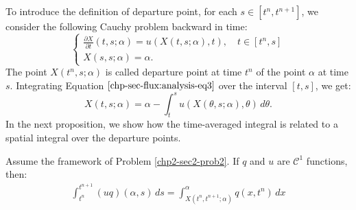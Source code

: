 To introduce the definition of departure point, for each $s \in [t^n,t^{n+1}]$,
we consider the following Cauchy problem backward in time:
\begin{equation}
	\label{chp-sec-flux:analysis-eq3}
	\begin{cases}
		\frac{\partial X}{\partial t} (t,s;\alpha) = u(X(t,s;\alpha) ,t),\quad t\in[t^{n},s] \\
		X(s,s;\alpha) = \alpha.
	\end{cases}
\end{equation}
The point $X(t^n,s;\alpha)$ is called departure point at time $t^n$
of the point $\alpha$ at time $s$.
Integrating Equation $\eqref{chp-sec-flux:analysis-eq3}$ over the interval
$[t,s]$, we get:
\begin{equation}
	\label{chp-sec-flux:analysis-eq4}
	X(t,s;\alpha) = \alpha - \int_{t}^{s}u(X(\theta,s;\alpha),\theta) \,d\theta.
\end{equation}
In the next proposition, we show how the time-averaged integral is related to 
a spatial integral over the departure points.
\begin{prop}
	\label{chp2-sec-flux:prop1}
	Assume the framework of Problem \ref{chp2-sec2-prob2}.
	If $q$ and $u$ are $\mathcal{C}^1$ functions, then:
	\begin{align}
		\label{chp2-sec-flux:approx1}
		\int_{t^n}^{t^{n+1}} (uq)(\alpha,s) \,ds = 
		\int^{\alpha}_{X(t^n,t^{n+1};\alpha)} q(x,t^n)\,dx
	\end{align}
\end{prop}
